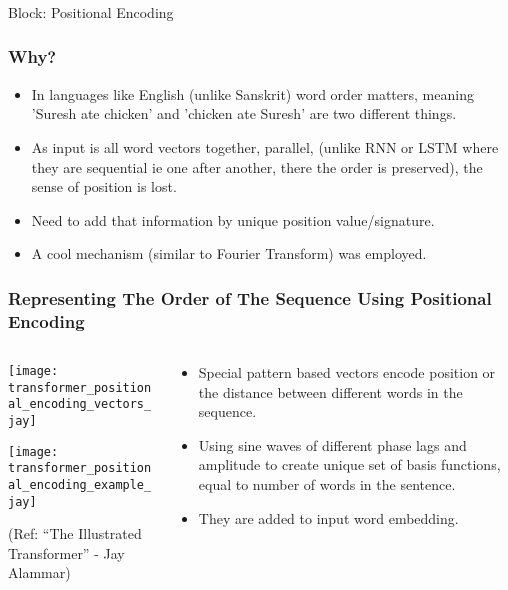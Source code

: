 \begin{frame}[fragile]\frametitle{}
\begin{center}
{\Large Block: Positional Encoding}
\end{center}
\end{frame}

\begin{frame}[fragile]\frametitle{Why?}


\begin{itemize}
\item In languages like English (unlike Sanskrit) word order matters, meaning 'Suresh ate chicken' and 'chicken ate Suresh' are two different things.
\item As input is all word vectors together, parallel, (unlike RNN or LSTM where they are sequential ie one after another, there the order is preserved), the sense of position is lost.
\item Need to add that information by unique position value/signature.
\item A cool mechanism (similar to Fourier Transform) was employed.
\end{itemize}

\end{frame}

\begin{frame}[fragile]\frametitle{Representing The Order of The Sequence Using Positional Encoding}


\begin{columns}
    \begin{column}[T]{0.5\linewidth}
\begin{center}
\texttt{[image: transformer\_positional\_encoding\_vectors\_jay]}

\texttt{[image: transformer\_positional\_encoding\_example\_jay]}


{\tiny (Ref: ``The Illustrated Transformer'' - Jay Alammar)}
\end{center}		

		\end{column}
    \begin{column}[T]{0.5\linewidth}

\begin{itemize}
\item Special pattern based vectors encode position or the distance between different words in the sequence. 
\item Using sine waves of different phase lags and amplitude to create unique set of basis functions, equal to number of words in the sentence.
\item They are added to input word embedding.
\end{itemize}
    \end{column}
  \end{columns}
\end{frame}


